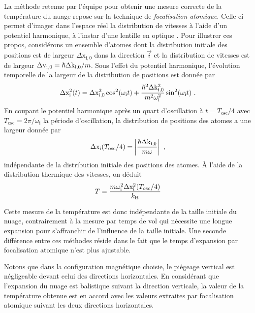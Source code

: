 La méthode retenue par l'équipe pour obtenir une mesure correcte de la température du nuage repose sur la technique de \emph{focalisation atomique}. Celle-ci permet d'imager dans l'espace réel la distribution de vitesses à l'aide d'un potentiel harmonique, à l'instar d'une lentille en optique \citep{murthy2014matter}. Pour illustrer ces propos, considérons un ensemble d'atomes dont la distribution initiale des positions est de largeur $\Delta\mathrm{x}_{\mathrm{i,0}}$ dans la direction $\vec{i}$ et la distribution de vitesses est de largeur $\Delta\mathrm{v}_{\mathrm{i,0}}=\hslash \Delta\mathrm{k}_{\mathrm{i,0}} /m$. Sous l'effet du potentiel harmonique, l'évolution temporelle de la largeur de la distribution de positions est donnée par
\begin{equation}
\Delta\mathrm{x}_{\mathrm{i}}^2(t)=\Delta\mathrm{x}_{\mathrm{i,0}}^2 \cos^2(\omega_{\mathrm{i}} t) + \frac{\hslash^2 \Delta\mathrm{k}_{\mathrm{i,0}}^2}{m^2 \omega_{\mathrm{i}}^2} \sin^2(\omega_{\mathrm{i}} t) \text{ .}
\end{equation}
En coupant le potentiel harmonique après un quart d'oscillation à $t=T_{\mathrm{osc}}/4$ avec $T_{\mathrm{osc}}= 2\pi/\omega_{\mathrm{i}}$ la période d'oscillation, la distribution de positions des atomes a une largeur donnée par
\begin{equation}
\Delta\mathrm{x}_{\mathrm{i}}(T_{\mathrm{osc}}/4)=\left|\frac{\hslash \Delta\mathrm{k}_{\mathrm{i,0}}}{m \omega}\right| \text{ ,}
\end{equation}
indépendante de la distribution initiale des positions des atomes. À l'aide de la distribution thermique des vitesses, on déduit
\begin{equation}
T=\frac{m \omega_{\mathrm{i}}^2 \Delta \mathrm{x}_{\mathrm{i}}^2(T_{\mathrm{osc}}/4)}{k_{\mathrm{B}}}
\end{equation}

Cette mesure de la température est donc indépendante de la taille initiale du nuage, contrairement à la mesure par temps de vol qui nécessite une longue expansion pour s'affranchir de l'influence de la taille initiale. Une seconde différence entre ces méthodes réside dans le fait que le temps d'expansion par focalisation atomique n'est plus ajustable. 

Notons que dans la configuration magnétique choisie, le piégeage vertical est négligeable devant celui des directions horizontales. En considérant que l'expansion du nuage est balistique suivant la direction verticale, la valeur de la température obtenue est en accord avec les valeurs extraites par focalisation atomique suivant les deux directions horizontales.

